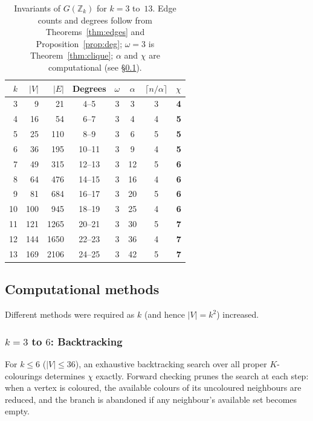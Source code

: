 \documentclass[12pt]{article}
\theoremstyle{definition}
\theoremstyle{remark}
\newcommand{\Z}{\mathbb{Z}}
\newcommand{\GZk}{G(\Z_k)}
\begin{document}
\begin{table}[h]
\centering
\begin{tabular}{@{}rrrccccr@{}}
\toprule
$k$ & $|V|$ & $|E|$ & Degrees & $\omega$ & $\alpha$ & $\lceil n/\alpha \rceil$ & $\chi$ \\
\midrule
 3 &   9 &    21 & 4--5   & 3 &  3 & 3 & \textbf{4} \\
 4 &  16 &    54 & 6--7   & 3 &  4 & 4 & \textbf{5} \\
 5 &  25 &   110 & 8--9   & 3 &  6 & 5 & \textbf{5} \\
 6 &  36 &   195 & 10--11 & 3 &  9 & 4 & \textbf{5} \\
 7 &  49 &   315 & 12--13 & 3 & 12 & 5 & \textbf{6} \\
 8 &  64 &   476 & 14--15 & 3 & 16 & 4 & \textbf{6} \\
 9 &  81 &   684 & 16--17 & 3 & 20 & 5 & \textbf{6} \\
10 & 100 &   945 & 18--19 & 3 & 25 & 4 & \textbf{6} \\
11 & 121 & 1265 & 20--21 & 3 & 30 & 5 & \textbf{7} \\
12 & 144 & 1650 & 22--23 & 3 & 36 & 4 & \textbf{7} \\
13 & 169 & 2106 & 24--25 & 3 & 42 & 5 & \textbf{7} \\
\bottomrule
\end{tabular}
\caption{Invariants of $\GZk$ for $k = 3$ to~$13$.  Edge counts and degrees
follow from Theorems~\ref{thm:edges} and Proposition~\ref{prop:deg};
$\omega = 3$ is Theorem~\ref{thm:clique}; $\alpha$ and $\chi$ are
computational (see \S\ref{sec:methods}).}
\label{tab:main}
\end{table}


\subsection{Computational methods}
\label{sec:methods}

Different methods were required as $k$ (and hence $|V| = k^2$) increased.

\subsubsection*{$k = 3$ to $6$: Backtracking}

For $k \le 6$ ($|V| \le 36$), an exhaustive backtracking search over all
proper $K$-colourings determines $\chi$ exactly.  Forward checking prunes
the search at each step: when a vertex is coloured, the available colours
of its uncoloured neighbours are reduced, and the branch is abandoned if
any neighbour's available set becomes empty.
\end{document}
